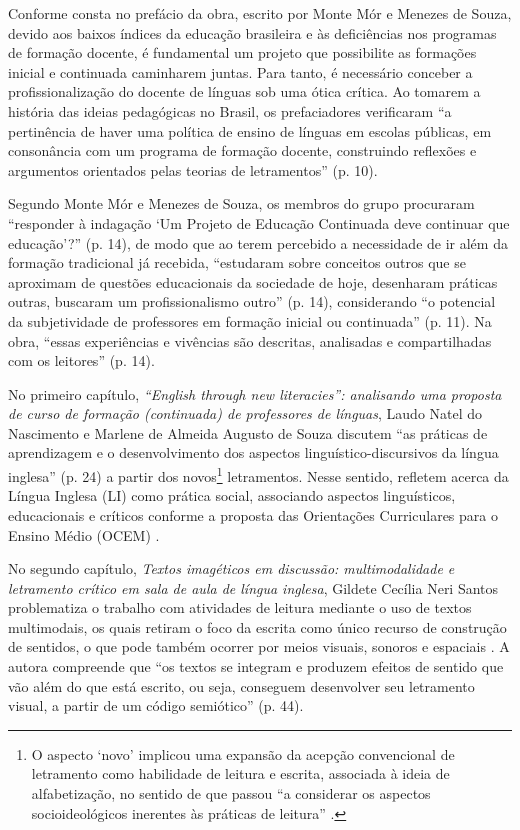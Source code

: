 \documentclass[portuguese]{textolivre}
\begin{document}
Conforme consta no prefácio da obra, escrito por Monte Mór e Menezes de Souza, devido aos baixos índices da educação brasileira e às deficiências nos programas de formação docente, é fundamental um projeto que possibilite as formações inicial e continuada caminharem juntas. Para tanto, é necessário conceber a profissionalização do docente de línguas sob uma ótica crítica. Ao tomarem a história das ideias pedagógicas no Brasil, os prefaciadores verificaram “a pertinência de haver uma política de ensino de línguas em escolas públicas, em consonância com um programa de formação docente, construindo reflexões e argumentos orientados pelas teorias de letramentos” (p. 10).

Segundo Monte Mór e Menezes de Souza, os membros do grupo procuraram “responder à indagação ‘Um Projeto de Educação Continuada deve continuar que educação’?” (p. 14), de modo que ao terem percebido a necessidade de ir além da formação tradicional já recebida, “estudaram sobre conceitos outros que se aproximam de questões educacionais da sociedade de hoje, desenharam práticas outras, buscaram um profissionalismo outro” (p. 14), considerando “o potencial da subjetividade de professores em formação inicial ou continuada” (p. 11). Na obra, “essas experiências e vivências são descritas, analisadas e compartilhadas com os leitores” (p. 14).

No primeiro capítulo, \textit{“English through new literacies”: analisando uma proposta de curso de formação (continuada) de professores de línguas}, Laudo Natel do Nascimento e Marlene de Almeida Augusto de Souza discutem “as práticas de aprendizagem e o desenvolvimento dos aspectos linguístico-discursivos da língua inglesa” (p. 24) a partir dos novos\footnote{O aspecto ‘novo’ implicou uma expansão da acepção convencional de letramento como habilidade de leitura e escrita, associada à ideia de alfabetização, no sentido de que passou “a considerar os aspectos socioideológicos inerentes às práticas de leitura” \cite[p. 21]{duboc_letramentos_2011}.} letramentos. Nesse sentido, refletem acerca da Língua Inglesa (LI) como prática social, associando aspectos linguísticos, educacionais e críticos conforme a proposta das Orientações Curriculares para o Ensino Médio (OCEM) \cite{brasil_orientacoes_2006}.

No segundo capítulo, \textit{Textos imagéticos em discussão: multimodalidade e letramento crítico em sala de aula de língua inglesa}, Gildete Cecília Neri Santos problematiza o trabalho com atividades de leitura mediante o uso de textos multimodais, os quais retiram o foco da escrita como único recurso de construção de sentidos, o que pode também ocorrer por meios visuais, sonoros e espaciais \cite{cope_multimodality_2003}. A autora compreende que “os textos se integram e produzem efeitos de sentido que vão além do que está escrito, ou seja, conseguem desenvolver seu letramento visual, a partir de um código semiótico” (p. 44).
\end{document}
